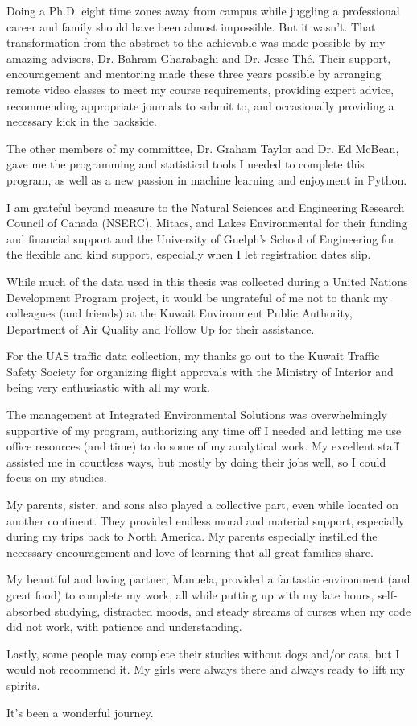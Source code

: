 \begin{acknowledgements}\label{acknow}

Doing a Ph.D. eight time zones away from campus while juggling a professional career and family should have been almost impossible. But it wasn't. That transformation from the abstract to the achievable was made possible by my amazing advisors, Dr. Bahram Gharabaghi and Dr. Jesse Th\'e. Their support, encouragement and mentoring made these three years possible by arranging remote video classes to meet my course requirements, providing expert advice, recommending appropriate journals to submit to, and occasionally providing a necessary kick in the backside.

The other members of my committee, Dr. Graham Taylor and Dr. Ed McBean, gave me the programming and statistical tools I needed to complete this program, as well as a new passion in machine learning and enjoyment in Python.

I am grateful beyond measure to the Natural Sciences and Engineering Research Council of Canada (NSERC), Mitacs, and Lakes Environmental for their funding and financial support and the University of Guelph's School of Engineering for the flexible and kind support, especially when I let registration dates slip.

While much of the data used in this thesis was collected during a United Nations Development Program project, it would be ungrateful of me not to thank my colleagues (and friends) at the Kuwait Environment Public Authority, Department of Air Quality and Follow Up for their assistance.

For the UAS traffic data collection, my thanks go out to the Kuwait Traffic Safety Society for organizing flight approvals with the Ministry of Interior and being very enthusiastic with all my work.

The management at Integrated Environmental Solutions was overwhelmingly supportive of my program, authorizing any time off I needed and letting me use office resources (and time) to do some of my analytical work. My excellent staff assisted me in countless ways, but mostly by doing their jobs well, so I could focus on my studies.

My parents, sister, and sons also played a collective part, even while located on another continent. They provided endless moral and material support, especially during my trips back to North America. My parents especially instilled the necessary encouragement and love of learning that all great families share.

My beautiful and loving partner, Manuela, provided a fantastic environment (and great food) to complete my work, all while putting up with my late hours, self-absorbed studying, distracted moods, and steady streams of curses when my code did not work, with patience and understanding.

Lastly, some people may complete their studies without dogs and/or cats, but I would not recommend it. My girls were always there and always ready to lift my spirits.

It's been a wonderful journey.

\end{acknowledgements}
